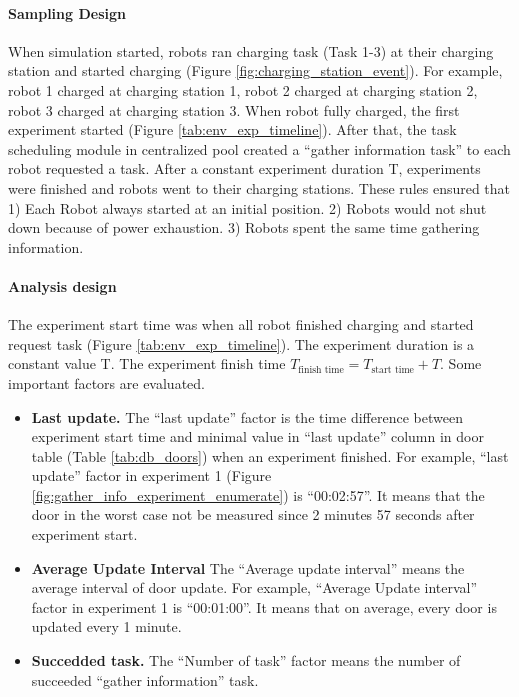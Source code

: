\paragraph{Sampling Design} When simulation started, robots ran charging task (Task 1-3) at their charging station and started charging (Figure \ref{fig:charging_station_event}). For example, robot 1 charged at charging station 1, robot 2 charged at charging station 2, robot 3 charged at charging station 3. When robot fully charged, the first experiment started (Figure \ref{tab:env_exp_timeline}). After that, the task scheduling module in centralized pool created a ``gather information task'' to each robot requested a task. After a constant experiment duration T, experiments were finished and robots went to their charging stations. These rules ensured that 1) Each Robot always started at an initial position. 2) Robots would not shut down because of power exhaustion. 3) Robots spent the same time gathering information.

\paragraph{Analysis design} The experiment start time was when all robot finished charging and started request task (Figure \ref{tab:env_exp_timeline}). The experiment duration is a constant value T. The experiment finish time $T_{\mbox{finish time}} = T_{\mbox{start time}} + T $. Some important factors are evaluated. 
\begin{itemize}
    \item \textbf{Last update.} The ``last update'' factor is the time difference between experiment start time and minimal value in ``last update'' column in door table (Table \ref{tab:db_doors}) when an experiment finished. For example, ``last update'' factor in experiment 1 (Figure \ref{fig:gather_info_experiment_enumerate}) is ``00:02:57''. It means that the door in the worst case not be measured since 2 minutes 57 seconds after experiment start.
    \item \textbf{Average Update Interval} The ``Average update interval'' means the average interval of door update. For example, ``Average Update interval'' factor in experiment 1 is ``00:01:00''. It means that on average, every door is updated every 1 minute.
    \item \textbf{Succedded task.} The ``Number of task'' factor  means the number of succeeded ``gather information'' task.
\end{itemize}

